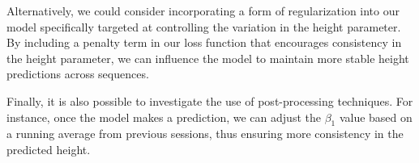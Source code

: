 Alternatively, we could consider incorporating a form of regularization into
our model specifically targeted at controlling the variation in the height
parameter. By including a penalty term in our loss function that encourages
consistency in the height parameter, we can influence the model to maintain
more stable height predictions across sequences.

Finally, it is also possible to investigate the use of post-processing
techniques. For instance, once the model makes a prediction, we can adjust the
$\beta_1$ value based on a running average from previous sessions, thus
ensuring more consistency in the predicted height.